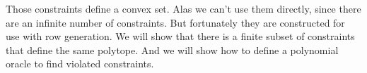 \documentclass{amsart} %
\begin{document}






Those constraints define a convex set.  Alas we can't use them
directly, since there are an infinite number of constraints.  But
fortunately they are constructed for use with row generation.  We will
show that there is a finite subset of constraints that define the same
polytope.  And we will show how to define a polynomial oracle to find
violated constraints.


\end{document}
